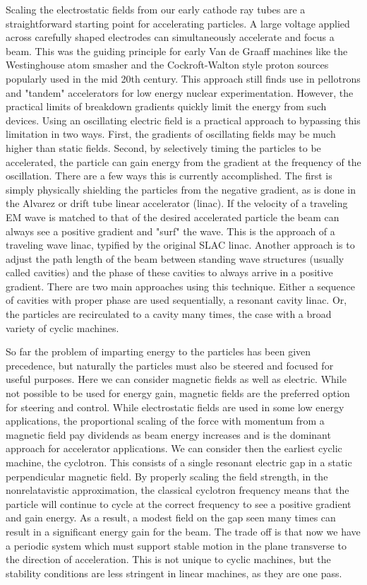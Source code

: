 Scaling the electrostatic fields from our early cathode ray tubes are a straightforward starting point for accelerating particles. A large voltage applied across carefully shaped electrodes can simultaneously accelerate and focus a beam. This was the guiding principle for early Van de Graaff machines like the Westinghouse atom smasher and the Cockroft-Walton style proton sources popularly used in the mid 20th century. This approach still finds use in pellotrons and "tandem" accelerators for low energy nuclear experimentation. However, the practical limits of breakdown gradients quickly limit the energy from such devices. Using an oscillating electric field is a practical approach to bypassing this limitation in two ways. First, the gradients of oscillating fields may be much higher than static fields. Second, by selectively timing the particles to be accelerated, the particle can gain energy from the gradient at the frequency of the oscillation. There are a few ways this is currently accomplished. The first is simply physically shielding the particles from the negative gradient, as is done in the Alvarez or drift tube linear accelerator (linac). If the velocity of a traveling EM wave is matched to that of the desired accelerated particle the beam can always see a positive gradient and "surf" the wave. This is the approach of a traveling wave linac, typified by the original SLAC linac. Another approach is to adjust the path length of the beam between standing wave structures (usually called cavities) and the phase of these cavities to always arrive in a positive gradient. There are two main approaches using this technique. Either a sequence of cavities with proper phase are used sequentially, a resonant cavity linac. Or, the particles are recirculated to a cavity many times, the case with a broad variety of cyclic machines.

So far the problem of imparting energy to the particles has been given precedence, but naturally the particles must also be steered and focused for useful purposes. Here we can consider magnetic fields as well as electric. While not possible to be used for energy gain, magnetic fields are the preferred option for steering and control. While electrostatic fields are used in some low energy applications, the proportional scaling of the force with momentum from a magnetic field pay dividends as beam energy increases and is the dominant approach for accelerator applications. We can consider then the earliest cyclic machine, the cyclotron. This consists of a single resonant electric gap in a static perpendicular magnetic field. By properly scaling the field strength, in the nonrelatavistic approximation, the classical cyclotron frequency means that the particle will continue to cycle at the correct frequency to see a positive gradient and gain energy. As a result, a modest field on the gap seen many times can result in a significant energy gain for the beam. The trade off is that now we have a periodic system which must support stable motion in the plane transverse to the direction of acceleration. This is not unique to cyclic machines, but the stability conditions are less stringent in linear machines, as they are one pass.

